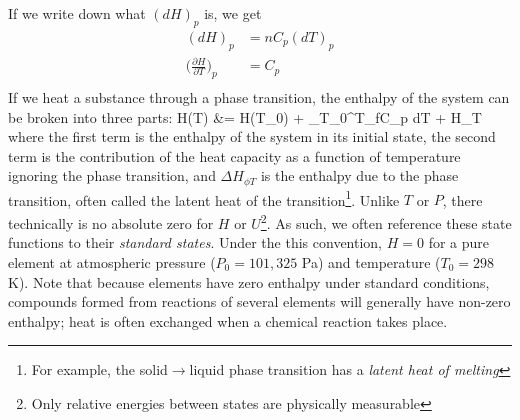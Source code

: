 \documentclass[12pt]{article}
\begin{document}
If we write down what $(dH)_p$ is, we get
\begin{align*}
(dH)_p &= n C_p (dT)_p\\
\Big(\frac{\partial H}{\partial T}\Big)_p &= C_p\\
\end{align*}
If we heat a substance through a phase transition, the enthalpy of the system can be broken into three parts:
\eqs
H(T) &= H(T_0) +  \int_{T_0}^{T_f}C_p  dT + \Delta H_{\phi T}
\eqe
where the first term is the enthalpy of the system in its initial state, the second term is the contribution of the heat capacity as a function of temperature ignoring the phase transition, and $\Delta H_{\phi T}$ is the enthalpy due to the phase transition, often called the latent heat of the transition\footnote{For example, the solid$\to$liquid phase transition has a \emph{latent heat of melting}}.  Unlike $T$ or $P$, there technically is no absolute zero for $H$ or $U$\footnote{Only relative energies between states are physically measurable}.  As such, we often reference these state functions to their \emph{standard states}. Under the this convention, $H=0$ for a pure element at atmospheric pressure ($P_0 = 101,325$ Pa) and temperature ($T_0 = 298$ K). Note that because elements have zero enthalpy under standard conditions, compounds formed from reactions of several elements will generally have non-zero enthalpy; heat is often exchanged when a chemical reaction takes place.\\
\end{document}
